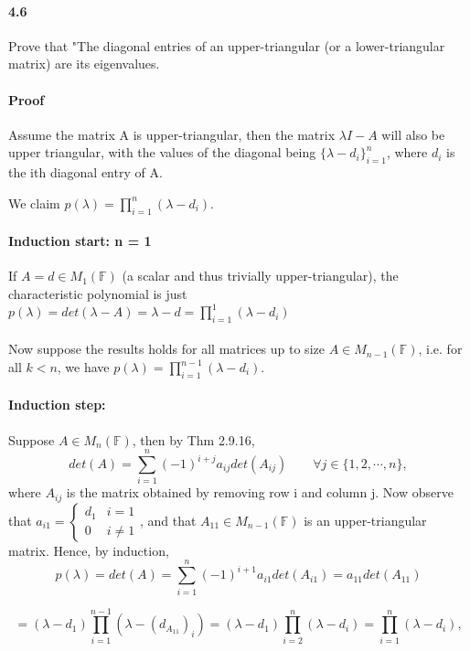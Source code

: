 \documentclass[letterpaper,12pt]{article}
\theoremstyle{definition}
\begin{document}
\paragraph{4.6} Prove that "The diagonal entries of an upper-triangular (or a lower-triangular matrix) are its eigenvalues.

\paragraph{Proof} Assume the matrix A is upper-triangular, then the matrix $\lambda I - A$ will also be upper triangular, with the values of the diagonal being $\{\lambda - d_i\}_{i = 1}^n$, where $d_i$ is the ith diagonal entry of A. 

We claim  $p(\lambda) = \prod_{i = 1}^n(\lambda - d_i)$.

\paragraph{Induction start: n = 1} If $A = d \in M_1(\mathbb{F})$ (a scalar and thus trivially upper-triangular), the characteristic polynomial is just $p(\lambda) = det(\lambda - A)
= \lambda - d = \prod_{i = 1}^1(\lambda - d_i)$

\paragraph{} Now suppose the results holds for all matrices up to size $A \in M_{n - 1}(\mathbb{F})$, i.e. for all $k < n$, we have $p(\lambda) = \prod_{i = 1}^{n-1}(\lambda - d_i)$.

\paragraph{Induction step:} Suppose $A \in M_n(\mathbb{F})$, then by Thm 2.9.16, $$det(A) =  \sum_{i = 1}^n (-1)^{i + j} a_{ij} det(A_{ij}) \qquad \forall j \in \{1, 2, \cdots, n\},$$ 
where $A_{ij}$ is the matrix obtained by removing row i and column j. 
Now observe that $a_{i1} = \begin{cases}
d_1 & i = 1 \\
0 & i \neq 1 
\end{cases} $,
and that $A_{11} \in M_{n - 1}(\mathbb{F})$ is an upper-triangular matrix. Hence, by induction,
	$$p(\lambda) = det(A) =  \sum_{i = 1}^n (-1)^{i + 1} a_{i1} det(A_{i1}) = a_{11} det(A_{11})$$
    
$$ = (\lambda - d_1) \prod_{i = 1}^{n-1}(\lambda - (d_{A_{11}})_i)
=(\lambda - d_1) \prod_{i = 2}^{n}(\lambda - d_i) = \prod_{i = 1}^{n}(\lambda - d_i),$$ 
\end{document}
